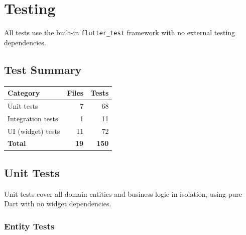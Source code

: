 \section{Testing}

All tests use the built-in \texttt{flutter\_test} framework with no external testing dependencies.

\subsection{Test Summary}

\begin{table}[H]
\centering
\begin{tabular}{|l|r|r|}
  \hline
  \textbf{Category} & \textbf{Files} & \textbf{Tests} \\
  \hline
  Unit tests        & 7  & 68 \\
  Integration tests & 1  & 11 \\
  UI (widget) tests & 11 & 72 \\
  \hline
  \textbf{Total}    & \textbf{19} & \textbf{150} \\
  \hline
\end{tabular}
\end{table}

\subsection{Unit Tests}

Unit tests cover all domain entities and business logic in isolation, using pure Dart with no widget dependencies.

\subsubsection{Entity Tests}


